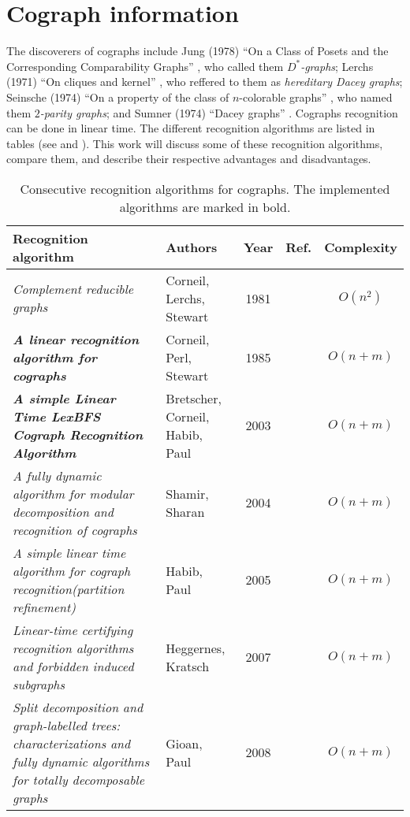 \section{Cograph information}
The discoverers of cographs include Jung (1978) ``On a Class of Posets and the Corresponding Comparability Graphs''  \cite{Jung1978OnAC}, who called them \emph{$D^*$-graphs}; Lerchs (1971) ``On cliques and kernel'' \cite{corneil_lerchs_stewart_81}, who reffered to them as \emph{hereditary Dacey graphs}; Seinsche (1974) ``On a property of the class of $n$-colorable graphs'' \cite{Seinsche1974OnAP}, who named them \emph{$2$-parity graphs}; and Sumner (1974) ``Dacey graphs'' \cite{Sumner1974DaceyG}. Cographs recognition can be done in linear time. The different recognition algorithms are listed in tables (see  and ). This work will discuss some of these recognition algorithms, compare them, and describe their respective advantages and disadvantages.


\begin{table}[ht]
\centering
\begin{tabular}{ | p{45mm} | p{19mm} | c | c | c | }
\hline
Recognition algorithm & Authors & Year & Ref. & Complexity \\ [0.5ex] 
\hline\hline

\emph{Complement reducible graphs} & 
Corneil, Lerchs, Stewart & 1981 & \cite{corneil_lerchs_stewart_81} & $O(n^2)$ \\
\hline

\textbf{\emph{A linear recognition algorithm for cographs}} & Corneil, Perl, Stewart & 1985 & \cite{corneil_perl_stewart_85} & $O(n + m)$\\
\hline

\textbf{\emph{A simple Linear Time LexBFS Cograph Recognition Algorithm}} & Bretscher, Corneil, Habib, Paul & 2003 & \cite{Bretscher2003ASL} & $O(n + m)$\\
\hline

\emph{A fully dynamic algorithm for modular decomposition and recognition of cographs} & Shamir, Sharan & 2004 & \cite{shamir_sharan_04} & $O(n + m)$\\
\hline

\emph{A simple linear time algorithm for cograph recognition(partition refinement)} & 
Habib, Paul & 2005 & \cite{Habib2005ASL} & $O(n + m)$ \\
\hline

\emph{Linear-time certifying recognition algorithms and forbidden induced subgraphs} & Heggernes, Kratsch & 2007 & \cite{heggernes_kratsch_07} & $O(n + m)$\\
\hline

\emph{Split decomposition and graph-labelled trees: characterizations and fully dynamic algorithms for totally decomposable graphs} & 
Gioan, Paul & 2008 & \cite{gioan_paul_08} & $O(n + m)$\\
\hline
\end{tabular}
\caption{Consecutive recognition algorithms for cographs. The implemented algorithms are marked in bold.}
\label{tbl:recognition_algorithms}
\end{table}


